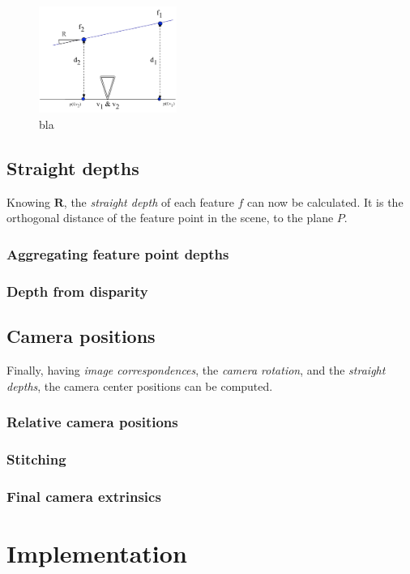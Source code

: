 \documentclass{scrreprt}
\newcommand{\matr}[1]{\mathbf{#1}}
\begin{document}
\begin{figure}
\centering
\includegraphics[width=0.4\textwidth]{differentdepthsview.pdf}
\caption{bla}
\label{fig:differentdepthsview}
\end{figure}


\pagebreak

\section{Straight depths}
\label{ref:straightdepths}
Knowing $\matr{R}$, the \emph{straight depth} of each feature $f$ can now be calculated. It is the orthogonal distance of the feature point in the scene, to the plane $P$.
\subsection{Aggregating feature point depths}

\subsection{Depth from disparity}

\section{Camera positions}
Finally, having \emph{image correspondences}, the \emph{camera rotation}, and the \emph{straight depths}, the camera center positions can be computed.

\subsection{Relative camera positions}

\subsection{Stitching}

\subsection{Final camera extrinsics}

\chapter{Implementation}

 
\end{document}
